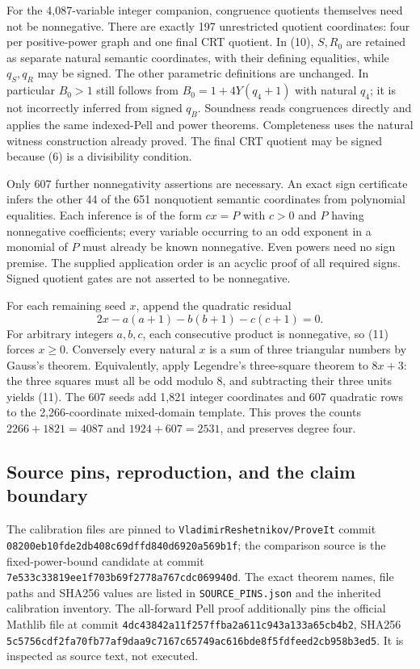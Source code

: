For the 4,087-variable integer companion, congruence quotients themselves
need not be nonnegative.  There are exactly 197 unrestricted quotient
coordinates: four per positive-power graph and one final CRT quotient.
In (10), $S,R_0$ are retained as separate natural semantic coordinates,
with their defining equalities, while $q_S,q_R$ may be signed.  The other
parametric definitions are unchanged.  In particular $B_0>1$ still follows
from $B_0=1+4Y(q_4+1)$ with natural $q_4$; it is not incorrectly inferred
from signed $q_B$.  Soundness reads congruences directly and applies the
same indexed-Pell and power theorems.  Completeness uses the natural
witness construction already proved.  The final CRT quotient may be
signed because (6) is a divisibility condition.

Only 607 further nonnegativity assertions are necessary.  An exact sign
certificate infers the other 44 of the 651 nonquotient semantic
coordinates from polynomial equalities.  Each inference is of the form
$c x=P$ with $c>0$ and $P$ having nonnegative coefficients; every variable
occurring to an odd exponent in a monomial of $P$ must already be known
nonnegative.  Even powers need no sign premise.  The supplied application
order is an acyclic proof of all required signs.  Signed quotient gates
are not asserted to be nonnegative.

For each remaining seed $x$, append the quadratic residual
\[
 2x-a(a+1)-b(b+1)-c(c+1)=0. \tag{11}
\]
For arbitrary integers $a,b,c$, each consecutive product is nonnegative,
so (11) forces $x\ge0$.  Conversely every natural $x$ is a sum of three
triangular numbers by Gauss's theorem.  Equivalently, apply Legendre's
three-square theorem to $8x+3$: the three squares must all be odd modulo
8, and subtracting their three units yields (11).
The 607 seeds add 1,821 integer coordinates and 607 quadratic rows to
the 2,266-coordinate mixed-domain template.  This proves the counts
$2266+1821=4087$ and $1924+607=2531$, and preserves degree four.

\subsection{Source pins, reproduction, and the claim boundary}

The calibration files are pinned to
\texttt{VladimirReshetnikov/ProveIt} commit
\nolinkurl{08200eb10fde2db408c69dffd840d6920a569b1f};
the comparison source is the fixed-power-bound candidate at commit
\nolinkurl{7e533c33819ee1f703b69f2778a767cdc069940d}.
The exact theorem names, file paths and SHA256 values are listed in
\texttt{SOURCE\_PINS.json} and the inherited calibration inventory.
The all-forward Pell proof additionally pins the official Mathlib file
at commit \nolinkurl{4dc43842a11f257ffba2a611c943a133a65cb4b2},
SHA256 \nolinkurl{5c5756cdf2fa70fb77af9daa9c7167c65749ac616bde8f5fdfeed2cb958b3ed5}.
It is inspected as source text, not executed.

